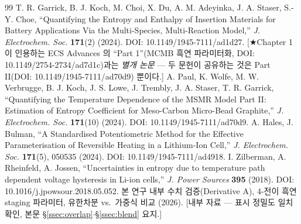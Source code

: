 \begin{thebibliography}{99}
 T. R. Garrick, B. J. Koch, M. Choi, X. Du, A. M. Adeyinka, J. A. Staser, S.-Y. Choe, ``Quantifying the Entropy and Enthalpy of Insertion Materials for Battery Applications Via the Multi-Species, Multi-Reaction Model,'' \emph{J. Electrochem. Soc.} \textbf{171}(2) (2024). DOI: 10.1149/1945-7111/ad1d27. [★Chapter 1 이 인용하는 ECS Advances 의 ``Part 1''(MCMB 흑연 파라미터화, DOI: 10.1149/2754-2734/ad7d1c)과는 \emph{별개 논문} --- 두 문헌이 공유하는 것은 Part II(DOI: 10.1149/1945-7111/ad70d9) 뿐이다.]
 A. Paul, K. Wolfe, M. W. Verbrugge, B. J. Koch, J. S. Lowe, J. Trembly, J. A. Staser, T. R. Garrick, ``Quantifying the Temperature Dependence of the MSMR Model Part II: Estimation of Entropy Coefficient for Meso-Carbon Micro-Bead Graphite,'' \emph{J. Electrochem. Soc.} \textbf{171}(10) (2024). DOI: 10.1149/1945-7111/ad70d9.
 A. Hales, J. Bulman, ``A Standardised Potentiometric Method for the Effective Parameterisation of Reversible Heating in a Lithium-Ion Cell,'' \emph{J. Electrochem. Soc.} \textbf{171}(5), 050535 (2024). DOI: 10.1149/1945-7111/ad4918.
 I. Zilberman, A. Rheinfeld, A. Jossen, ``Uncertainties in entropy due to temperature path dependent voltage hysteresis in Li-ion cells,'' \emph{J. Power Sources} \textbf{395} (2018). DOI: 10.1016/j.jpowsour.2018.05.052.
 본 연구 내부 수치 검증(Derivative A),  4-전이 흑연 staging 파라미터, 유한차분 vs.\ 가중식 비교 (2026). [내부 자료 --- 표시 정밀도 일치 확인, 본문 \S\ref{ssec:overlap}$\cdot$\S\ref{ssec:blend} 요지.]
\end{thebibliography}

